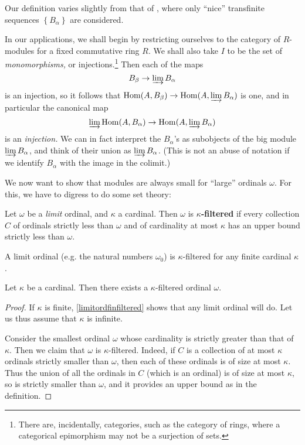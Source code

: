 Our definition varies slightly from that of \cite{Ho07}, where only ``nice''
transfinite sequences $\left\{B_\alpha\right\}$ are considered.

In our applications, we shall begin by restricting ourselves to the category
of $R$-modules for a fixed commutative ring $R$.
We shall also take $I$ to be the set of \emph{monomorphisms,} or
injections.\footnote{There are, incidentally, categories, such as the category
of rings, where a categorical epimorphism may not be a surjection of sets.}
Then each of the maps
\[ B_\beta \to \varinjlim B_\alpha  \]
is an injection, so it follows that 
$\hom(A, B_\beta )\to \hom (A, \varinjlim  B_\alpha)$ is one, and in
particular the canonical map
\begin{equation} \label{homcolimmap} \varinjlim \hom(A, B_\alpha) \to \hom (A,
\varinjlim  B_\alpha)  \end{equation}
is an \emph{injection.}
We can in fact interpret the $B_\alpha$'s as subobjects of the big module
$\varinjlim B_\alpha$, and think of their union as $\varinjlim B_\alpha$.
(This is not an abuse of notation if we identify $B_\alpha$ with the image in
the colimit.)

We now want to show that modules are always small for ``large'' ordinals
$\omega$.
For this, we have to digress to do some set theory:

\begin{definition} 
Let $\omega$ be a \emph{limit} ordinal, and $\kappa$ a cardinal. Then $\omega$ is
\textbf{$\kappa$-filtered} if every collection $C$ of ordinals strictly less
than $\omega$ and of cardinality at most $\kappa$ has an upper bound strictly
less than $\omega$.
\end{definition} 

\begin{example} \label{limitordfinfiltered}
A limit ordinal (e.g. the natural numbers $\omega_0$) is $\kappa$-filtered for any finite cardinal $\kappa$.
\end{example} 


\begin{proposition} 
Let $\kappa$ be a cardinal. Then there exists a $\kappa$-filtered ordinal
$\omega$.
\end{proposition} 
\begin{proof} 
If $\kappa$ is finite, \cref{limitordfinfiltered} shows that any limit ordinal
will do.  Let us thus assume that $\kappa$ is infinite.

Consider the smallest ordinal $\omega$ whose cardinality is strictly greater
than that of $\kappa$. Then we claim that $\omega$ is $\kappa$-filtered.
Indeed, if $C$ is a collection of at most $\kappa$ ordinals strictly smaller
than $\omega$, then each of these ordinals is of size at most $\kappa$. Thus
the union of all the ordinals in $C$ (which is an ordinal) is of size at most
$\kappa$, so is strictly smaller than $\omega$, and it provides an upper bound as in the definition.
\end{proof} 



